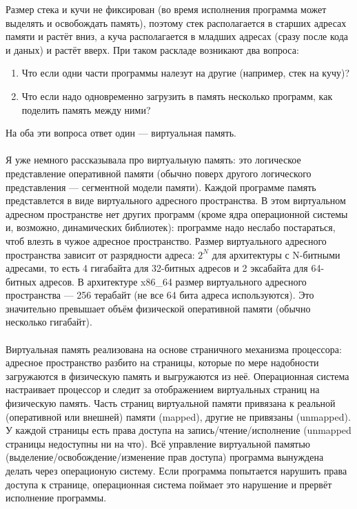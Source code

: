 \documentclass[11pt]{book}
\begin{document}
Размер стека и кучи не фиксирован (во время исполнения программа может выделять и освобождать память),
поэтому стек располагается в старших адресах памяти и растёт вниз,
а куча располагается в младших адресах (сразу после кода и даных) и растёт вверх.
При таком раскладе возникают два вопроса:
\begin{enumerate}
\item Что если одни части программы налезут на другие (например, стек на кучу)?
\item Что если надо одновременно загрузить в память несколько программ, как поделить память между ними?
\end{enumerate}
На оба эти вопроса ответ один --- виртуальная память.
\\ \\
Я уже немного рассказывала про виртуальную память: это логическое представление оперативной памяти
(обычно поверх другого логического представления --- сегментной модели памяти).
Каждой программе память представлется в виде виртуального адресного пространства.
В этом виртуальном адресном пространстве нет других программ (кроме ядра операционной системы и, возможно, динамических библиотек):
программе надо неслабо постараться, чтоб влезть в чужое адресное пространство.
Размер виртуального адресного пространства зависит от разрядности адреса: $2^N$ для архитектуры с N-битными адресами,
то есть 4 гигабайта для 32-битных адресов и 2 эксабайта для 64-битных адресов.
В архитектуре x86\_64 размер виртуального адресного пространства --- 256 терабайт (не все 64 бита адреса используются).
Это значительно превышает объём физической оперативной памяти (обычно несколько гигабайт).
\\ \\
Виртуальная память реализована на основе страничного механизма процессора:
адресное пространство разбито на страницы, которые по мере надобности загружаются в физическую память и выгружаются из неё.
Операционная система настраивает процессор и следит за отображением виртуальных страниц на физическую память.
Часть страниц виртуальной памяти привязана к реальной (оперативной или внешней) памяти (mapped), другие не привязаны (unmapped).
У каждой страницы есть права доступа на запись/чтение/исполнение (unmapped страницы недоступны ни на что).
Всё управление виртуальной памятью (выделение/освобождение/изменение прав доступа) программа вынуждена делать через операционую систему.
Если программа попытается нарушить права доступа к странице, операционная система поймает это нарушение и прервёт исполнение программы.
\\ \\
\end{document}
